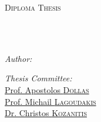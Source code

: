 \documentclass[
	11pt, %
	english, %
	singlespacing, %
	liststotoc, %
	toctotoc, %
	parskip, %
	headsepline, %
	chapterinoneline, %
]{MastersDoctoralThesis} %
\author{Tzanis \textsc{Fotakis}} %
\begin{document}
\frontmatter %

\pagestyle{plain} %


\begin{titlepage}
	\begin{center}

		\vspace*{.06\textheight}
		{\scshape\LARGE \univname\par}\vspace{1.5cm} %
		\textsc{\Large Diploma Thesis}\\[0.5cm] %

		\HRule \\[0.4cm] %
		{\huge \bfseries \ttitle\par}\vspace{0.4cm} %
		\HRule \\[1.5cm] %

		\begin{minipage}[t]{0.4\textwidth}
			\begin{flushleft} \large
				\emph{Author:}\\
				\href{https://www.linkedin.com/in/fotakistzanis/}{\authorname} %
			\end{flushleft}
		\end{minipage}
		\begin{minipage}[t]{0.5\textwidth}
			\begin{flushright} \large
				\emph{Thesis Committee:} \\
				\href{https://www.ece.tuc.gr/index.php?id=4531&tx_tuclabspersonnel_list%5Bperson%5D=289&tx_tuclabspersonnel_list%5Baction%5D=person&tx_tuclabspersonnel_list%5Bcontroller%5D=List}{Prof. Apostolos \textsc{Dollas}}\\ %
				\href{https://www.ece.tuc.gr/index.php?id=4531&tx_tuclabspersonnel_list%5Bperson%5D=313&tx_tuclabspersonnel_list%5Baction%5D=person&tx_tuclabspersonnel_list%5Bcontroller%5D=List}{Prof. Michail \textsc{Lagoudakis}}\\
				\href{https://www.linkedin.com/in/christos-kozanitis-a3b173a8/}{Dr. Christos \textsc{Kozanitis}}
			\end{flushright}
		\end{minipage}\\[0.2cm]


\end{center}
\end{titlepage}
\end{document}
